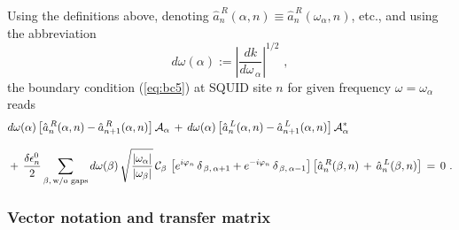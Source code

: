 \noindent
Using the definitions above, denoting $\hat{a}_n^{\,R}(\alpha,n) \equiv \hat{a}_n^{\,R}(\omega_{\alpha},n)$, etc., 
and using the abbreviation
%
\begin{equation} \label{eq:dwn}
d\omega(\alpha) := \left|\frac{dk}{d\omega_{\,\alpha}} \right|^{1/2} \, \, ,
\end{equation}
%
the boundary condition (\ref{eq:bc5}) at SQUID site $n$ for given frequency $\omega = \omega_{\alpha}$ reads
%
\begin{equation} \label{eq:bc6}
\begin{split}
& d\omega(\alpha) \left[ \hat{a}_n^{\,R}(\alpha,n) - \hat{a}_{n+1}^{\,R}(\alpha,n) \right] 
{\cal A}_{\alpha} \, + \, 
d\omega(\alpha) \left[ \hat{a}_n^{\,L}(\alpha,n) - \hat{a}_{n+1}^{\,L}(\alpha,n) \right] 
{\cal A}_{\alpha}^* \\[3mm]
& + \, \frac{\delta \epsilon_n^0}{2}
\sum_{\beta, \, \text{w/o gaps}} d\omega(\beta) \, 
\sqrt{\frac{|\omega_{\alpha}|}{|\omega_{\beta}|}} \, {\cal C}_{\beta} \,
\left[e^{i \varphi_n} \, \delta_{\,\beta,\,\alpha+1} + e^{- i \varphi_n} \, \delta_{\,\beta,\,\alpha-1} \right]
\left[ \hat{a}_n^{\,R}(\beta,n) \, + \, \hat{a}_n^{\,L}(\beta,n) \right] \, = \, 0 \, \, .
\end{split}
\end{equation}


\subsubsection{Vector notation and transfer matrix} \label{subsubsec:vector}

